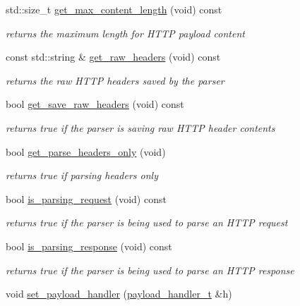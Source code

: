 \begin{DoxyCompactItemize}
std\-::size\-\_\-t \hyperlink{classpion_1_1http_1_1parser_a2c6bf6775a9b1d8f1965190ef0dec780}{get\-\_\-max\-\_\-content\-\_\-length} (void) const 
\begin{DoxyCompactList}\small\item\em returns the maximum length for H\-T\-T\-P payload content \end{DoxyCompactList}\item 
const std\-::string \& \hyperlink{classpion_1_1http_1_1parser_a83774cd75b3a549a72ad45da17c99431}{get\-\_\-raw\-\_\-headers} (void) const 
\begin{DoxyCompactList}\small\item\em returns the raw H\-T\-T\-P headers saved by the parser \end{DoxyCompactList}\item 
bool \hyperlink{classpion_1_1http_1_1parser_ab5b4e9b0acdd3cd6b4ac3cfcc76c9a6f}{get\-\_\-save\-\_\-raw\-\_\-headers} (void) const 
\begin{DoxyCompactList}\small\item\em returns true if the parser is saving raw H\-T\-T\-P header contents \end{DoxyCompactList}\item 
bool \hyperlink{classpion_1_1http_1_1parser_a37e691fd12abb6be3bf2f0dda3c412d7}{get\-\_\-parse\-\_\-headers\-\_\-only} (void)
\begin{DoxyCompactList}\small\item\em returns true if parsing headers only \end{DoxyCompactList}\item 
bool \hyperlink{classpion_1_1http_1_1parser_a94bf8701f781109b664d10e86bd67b8f}{is\-\_\-parsing\-\_\-request} (void) const 
\begin{DoxyCompactList}\small\item\em returns true if the parser is being used to parse an H\-T\-T\-P request \end{DoxyCompactList}\item 
bool \hyperlink{classpion_1_1http_1_1parser_a057f0ee607bef1057902093f12861c1f}{is\-\_\-parsing\-\_\-response} (void) const 
\begin{DoxyCompactList}\small\item\em returns true if the parser is being used to parse an H\-T\-T\-P response \end{DoxyCompactList}\item 
void \hyperlink{classpion_1_1http_1_1parser_a4605c605bf452336f34d7d48fce68ef6}{set\-\_\-payload\-\_\-handler} (\hyperlink{classpion_1_1http_1_1parser_abff772b79d2a912b0f9a4932d8f03a35}{payload\-\_\-handler\-\_\-t} \&h)

\end{DoxyCompactItemize}
